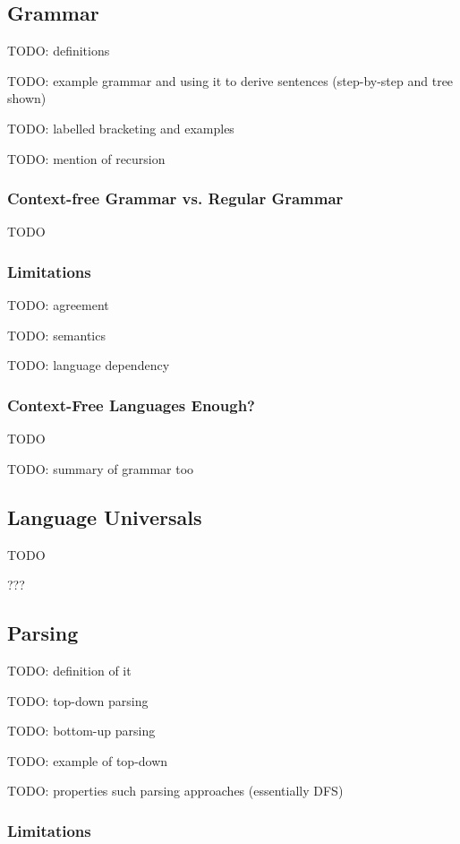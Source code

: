 \documentclass{article}
\begin{document}
\subsection{Grammar}

TODO: definitions

TODO: example grammar and using it to derive sentences (step-by-step and tree shown)

TODO: labelled bracketing and examples

TODO: mention of recursion

\subsubsection{Context-free Grammar vs. Regular Grammar}

TODO

\subsubsection{Limitations}

TODO: agreement

TODO: semantics

TODO: language dependency

\subsubsection{Context-Free Languages Enough?}

TODO

TODO: summary of grammar too

\subsection{Language Universals}

TODO

???

\subsection{Parsing}

TODO: definition of it

TODO: top-down parsing

TODO: bottom-up parsing

TODO: example of top-down

TODO: properties such parsing approaches (essentially DFS)

\subsubsection{Limitations}
\end{document}

